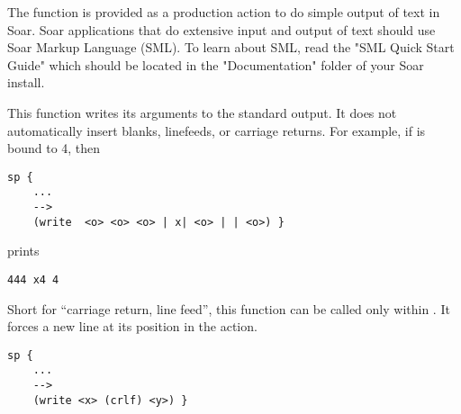 The function  is provided as a production
action to do simple output of text in Soar. Soar applications that
do extensive input and output of text should use Soar Markup Language (SML). To learn
about SML, read the "SML Quick Start Guide" which should be located in the "Documentation" 
folder of your Soar install.

 
\begin{description}
\item [\soarb{write} --- ] This function writes its arguments to the standard
        output. It does not automatically insert blanks, linefeeds, or carriage
        returns.  For example, if  is bound to 4, then
\begin{verbatim}
sp {
    ...
    -->
    (write  <o> <o> <o> | x| <o> | | <o>) }
\end{verbatim}
        prints

\begin{verbatim}
444 x4 4
\end{verbatim}

\item [\soarb{crlf} --- ] Short for ``carriage return, line feed'', this
        function can be called only within . It forces a new line
        at its position in the  action. 
\begin{verbatim}
sp {
    ...
    -->
    (write <x> (crlf) <y>) }
\end{verbatim}





\end{description}
